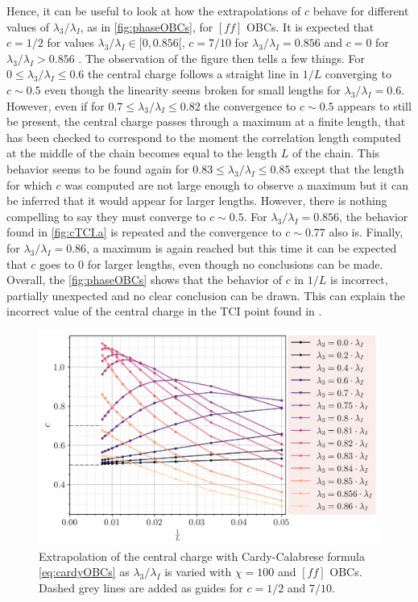 	Hence, it can be useful to look at how the extrapolations of $c$ behave for different values of $\lambda_3/\lambda_I$, as in \autoref{fig:phaseOBCs}, for $[ff]$ OBCs. It is expected that $c =1/2$ for values $\lambda_3/\lambda_I \in [0, 0.856[$, $c=7/10$ for $\lambda_3/\lambda_I =0.856$ and $c=0$ for $\lambda_3/\lambda_I>0.856$ \cite{obrien2018}. The observation of the figure then tells a few things. For $0\leq \lambda_3/\lambda_I \leq 0.6$ the central charge follows a straight line in $1/L$ converging to $c\sim 0.5$ even though the linearity seems broken for small lengths for $\lambda_3/\lambda_I=0.6$. However, even if for $0.7\leq \lambda_3/\lambda_I \leq 0.82$ the convergence to $c\sim 0.5$ appears to still be present, the central charge passes through a maximum at a finite length, that has been checked to correspond to the moment the correlation length computed at the middle of the chain becomes equal to the length $L$ of the chain. %
	This behavior seems to be found again for $0.83\leq \lambda_3/\lambda_I \leq 0.85$ except that the length for which $c$ was computed are not large enough to observe a maximum but it can be inferred that it would appear for larger lengths. However, there is nothing compelling to say they must converge to $c\sim 0.5$. For $\lambda_3/\lambda_I=0.856$, the behavior found in \autoref{fig:cTCI.a} is repeated and the convergence to $c\sim 0.77$ also is. Finally, for $\lambda_3/\lambda_I=0.86$, a maximum is again reached but this time it can be expected that $c$ goes to $0$ for larger lengths, even though no conclusions can be made. Overall, the \autoref{fig:phaseOBCs} shows that the behavior of $c$ in $1/L$ is incorrect, partially unexpected and no clear conclusion can be drawn. This can explain the incorrect value of the central charge in the TCI point found in \cite{obrien2018}.

	\begin{figure}[h!]
		\centering
		\includegraphics[scale=0.66]{../graphs/phase/ff/chi=100.0_J=1.0_h=1.0_i=1.0_c=0.0.png}
		\caption{Extrapolation of the central charge with Cardy-Calabrese formula \eqref{eq:cardyOBCs} as $\lambda_3/\lambda_I$ is varied with $\chi=100$ and $[ff]$ OBCs. Dashed grey lines are added as guides for $c=1/2$ and $7/10$.}
		\label{fig:phaseOBCs}
	\end{figure}


